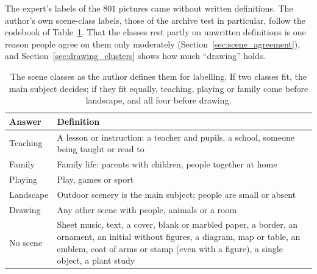 The expert's labels of the $801$ pictures came without written definitions. The author's own scene-class labels, those of the archive test in particular, follow the codebook of Table~\ref{tab:scene_codebook}. That the classes rest partly on unwritten definitions is one reason people agree on them only moderately (Section~\ref{sec:scene_agreement}), and Section~\ref{sec:drawing_clusters} shows how much ``drawing'' holds.

\begin{table}[!htbp]
\centering
\caption[The scene classes as defined for labelling]{The scene classes as the author defines them for labelling. If two classes fit, the main subject decides; if they fit equally, teaching, playing or family come before landscape, and all four before drawing.}
\label{tab:scene_codebook}
\small
\begin{tabular}{l>{\raggedright\arraybackslash}p{11cm}}
\toprule
Answer & Definition \\
\midrule
Teaching & A lesson or instruction: a teacher and pupils, a school, someone being taught or read to \\
Family & Family life: parents with children, people together at home \\
Playing & Play, games or sport \\
Landscape & Outdoor scenery is the main subject; people are small or absent \\
Drawing & Any other scene with people, animals or a room \\
No scene & Sheet music, text, a cover, blank or marbled paper, a border, an ornament, an initial without figures, a diagram, map or table, an emblem, coat of arms or stamp (even with a figure), a single object, a plant study \\
\bottomrule
\end{tabular}
\end{table}


